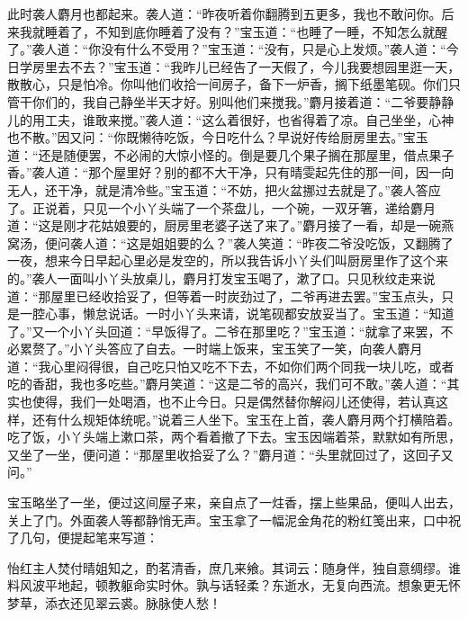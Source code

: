 \begin{parag}
    此时袭人麝月也都起来。袭人道：“昨夜听着你翻腾到五更多，我也不敢问你。后来我就睡着了，不知到底你睡着了没有？”宝玉道：“也睡了一睡，不知怎么就醒了。”袭人道：“你没有什么不受用？”宝玉道：“没有，只是心上发烦。”袭人道：“今日学房里去不去？”宝玉道：“我昨儿已经告了一天假了，今儿我要想园里逛一天，散散心，只是怕冷。你叫他们收拾一间房子，备下一炉香，搁下纸墨笔砚。你们只管干你们的，我自己静坐半天才好。别叫他们来搅我。”麝月接着道：“二爷要静静儿的用工夫，谁敢来搅。”袭人道：“这么着很好，也省得着了凉。自己坐坐，心神也不散。”因又问：“你既懒待吃饭，今日吃什么？早说好传给厨房里去。”宝玉道：“还是随便罢，不必闹的大惊小怪的。倒是要几个果子搁在那屋里，借点果子香。”袭人道：“那个屋里好？别的都不大干净，只有晴雯起先住的那一间，因一向无人，还干净，就是清冷些。”宝玉道：“不妨，把火盆挪过去就是了。”袭人答应了。正说着，只见一个小丫头端了一个茶盘儿，一个碗，一双牙箸，递给麝月道：“这是刚才花姑娘要的，厨房里老婆子送了来了。”麝月接了一看，却是一碗燕窝汤，便问袭人道：“这是姐姐要的么？”袭人笑道：“昨夜二爷没吃饭，又翻腾了一夜，想来今日早起心里必是发空的，所以我告诉小丫头们叫厨房里作了这个来的。”袭人一面叫小丫头放桌儿，麝月打发宝玉喝了，漱了口。只见秋纹走来说道：“那屋里已经收拾妥了，但等着一时炭劲过了，二爷再进去罢。”宝玉点头，只是一腔心事，懒怠说话。一时小丫头来请，说笔砚都安放妥当了。宝玉道：“知道了。”又一个小丫头回道：“早饭得了。二爷在那里吃？”宝玉道：“就拿了来罢，不必累赘了。”小丫头答应了自去。一时端上饭来，宝玉笑了一笑，向袭人麝月道：“我心里闷得很，自己吃只怕又吃不下去，不如你们两个同我一块儿吃，或者吃的香甜，我也多吃些。”麝月笑道：“这是二爷的高兴，我们可不敢。”袭人道：“其实也使得，我们一处喝酒，也不止今日。只是偶然替你解闷儿还使得，若认真这样，还有什么规矩体统呢。”说着三人坐下。宝玉在上首，袭人麝月两个打横陪着。吃了饭，小丫头端上漱口茶，两个看着撤了下去。宝玉因端着茶，默默如有所思，又坐了一坐，便问道：“那屋里收拾妥了么？”麝月道：“头里就回过了，这回子又问。”
\end{parag}


\begin{parag}
    宝玉略坐了一坐，便过这间屋子来，亲自点了一炷香，摆上些果品，便叫人出去，关上了门。外面袭人等都静悄无声。宝玉拿了一幅泥金角花的粉红笺出来，口中祝了几句，便提起笔来写道：
\end{parag}


\begin{qute2sp}
    怡红主人焚付晴姐知之，酌茗清香，庶几来飨。其词云：随身伴，独自意绸缪。谁料风波平地起，顿教躯命实时休。孰与话轻柔？东逝水，无复向西流。想象更无怀梦草，添衣还见翠云裘。脉脉使人愁！
\end{qute2sp}


